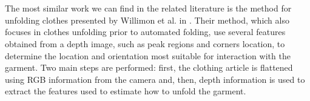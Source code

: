 
\section{}

The most similar work we can find in the related literature is the method for unfolding clothes presented by Willimon et al. in \cite{Willimon2011}. Their method, which also focuses in clothes unfolding prior to automated folding, use several features obtained from a depth image, such as peak regions and corners location, to determine the location and orientation most suitable for interaction with the garment. Two main steps are performed: first, the clothing article is flattened using RGB information from the camera and, then, depth information is used to extract the features used to estimate how to unfold the garment.